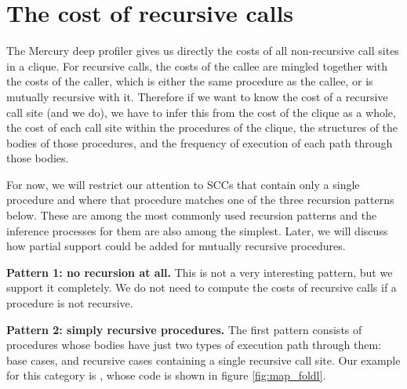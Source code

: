 


\section{The cost of recursive calls}
\label{sec:overlap_reccalls}


The Mercury deep profiler gives us directly
the costs of all non-recursive call sites in a clique.
For recursive calls,
the costs of the callee are mingled together
with the costs of the caller,
which is either the same procedure as the callee,
or is mutually recursive with it.
Therefore if we want to know the cost of a recursive call site (and we do),
we have to infer this
from the cost of the clique as a whole,
the cost of each call site within the procedures of the clique,
the structures of the bodies of those procedures,
and the frequency of execution of each path through those bodies.

For now, we will restrict our attention to SCCs
that contain only a single procedure and where that procedure matches one of
the three recursion patterns below.
These are among the most commonly used recursion patterns and the
inference processes for them are also among the simplest.
Later, we will discuss how partial support could be added for mutually
recursive procedures.

{\bf Pattern 1: no recursion at all.}
This is not a very interesting pattern, but we support it completely.
We do not need to compute the costs of recursive calls if a procedure is not
recursive.

{\bf Pattern 2: simply recursive procedures.}
The first pattern consists of procedures whose bodies
have just two types of execution path through them:
base cases, and recursive cases containing a single recursive call site.
Our example for this category is ,
whose code is shown in figure \ref{fig:map_foldl}.


